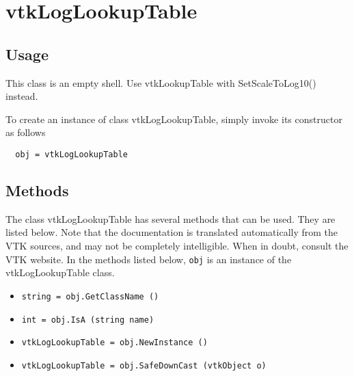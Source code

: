\section{vtkLogLookupTable}

\subsection{Usage}

 This class is an empty shell.  Use vtkLookupTable with SetScaleToLog10()
 instead.


To create an instance of class vtkLogLookupTable, simply
invoke its constructor as follows
\begin{verbatim}
  obj = vtkLogLookupTable
\end{verbatim}
\subsection{Methods}

The class vtkLogLookupTable has several methods that can be used.
  They are listed below.
Note that the documentation is translated automatically from the VTK sources,
and may not be completely intelligible.  When in doubt, consult the VTK website.
In the methods listed below, \verb|obj| is an instance of the vtkLogLookupTable class.
\begin{itemize}
\item  \verb|string = obj.GetClassName ()|

\item  \verb|int = obj.IsA (string name)|

\item  \verb|vtkLogLookupTable = obj.NewInstance ()|

\item  \verb|vtkLogLookupTable = obj.SafeDownCast (vtkObject o)|

\end{itemize}
